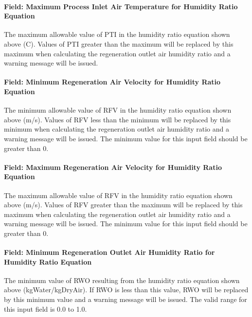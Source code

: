 \paragraph{Field: Maximum Process Inlet Air Temperature for Humidity Ratio Equation}\label{field-maximum-process-inlet-air-temperature-for-humidity-ratio-equation}

The maximum allowable value of PTI in the humidity ratio equation shown above (C). Values of PTI greater than the maximum will be replaced by this maximum when calculating the regeneration outlet air humidity ratio and a warning message will be issued.

\paragraph{Field: Minimum Regeneration Air Velocity for Humidity Ratio Equation}\label{field-minimum-regeneration-air-velocity-for-humidity-ratio-equation}

The minimum allowable value of RFV in the humidity ratio equation shown above (m/s). Values of RFV less than the minimum will be replaced by this minimum when calculating the regeneration outlet air humidity ratio and a warning message will be issued. The minimum value for this input field should be greater than 0.

\paragraph{Field: Maximum Regeneration Air Velocity for Humidity Ratio Equation}\label{field-maximum-regeneration-air-velocity-for-humidity-ratio-equation}

The maximum allowable value of RFV in the humidity ratio equation shown above (m/s). Values of RFV greater than the maximum will be replaced by this maximum when calculating the regeneration outlet air humidity ratio and a warning message will be issued. The minimum value for this input field should be greater than 0.

\paragraph{Field: Minimum Regeneration Outlet Air Humidity Ratio for Humidity Ratio Equation}\label{field-minimum-regeneration-outlet-air-humidity-ratio-for-humidity-ratio-equation}

The minimum value of RWO resulting from the humidity ratio equation shown above (kgWater/kgDryAir). If RWO is less than this value, RWO will be replaced by this minimum value and a warning message will be issued. The valid range for this input field is 0.0 to 1.0.

